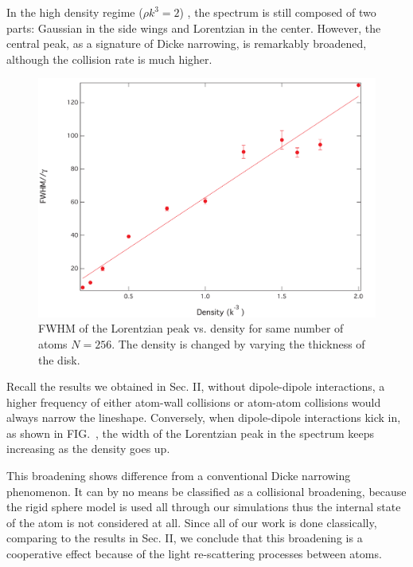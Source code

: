 In the high density regime ($\rho k^3=2$) , the spectrum is still composed of two parts: Gaussian in the side wings and Lorentzian in the center. However, the central peak, as a signature of Dicke narrowing, is remarkably broadened, although the collision rate is much higher.

\begin{figure}[h!]
\begin{center}
\includegraphics[width=\textwidth]{FWHM.pdf}
\end{center}
\caption{FWHM of the Lorentzian peak vs. density for same number of atoms $N=256$. The density is changed by varying the thickness of the disk.}
\label{FWHM}
\end{figure}

Recall the results we obtained in Sec. II, without dipole-dipole interactions, a higher frequency of either atom-wall collisions or atom-atom collisions would always narrow the lineshape. Conversely, when dipole-dipole interactions kick in, as shown in FIG.~, the width of the Lorentzian peak in the spectrum keeps increasing as the density goes up. 

This broadening shows difference from a conventional Dicke narrowing phenomenon. It can by no means be classified as a collisional broadening, because the rigid sphere model is used all through our simulations thus the internal state of the atom is not considered at all. Since all of our work is done classically,  comparing to the results in Sec. II, we conclude that this broadening is a cooperative effect because of the light re-scattering processes between atoms.
